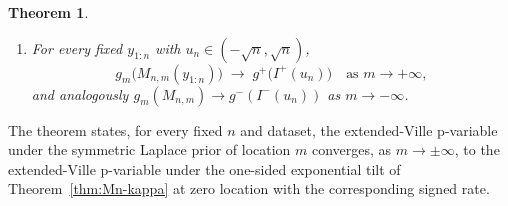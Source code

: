 \documentclass{article}%
\newtheorem{theorem}{Theorem}[section]
\newcommand{\E}{\mathbb{E}}
\newcommand{\1}{\mathbf{1}}
\begin{document}
\begin{theorem}
\begin{enumerate}
\begin{equation}
  g_m(c) \;:=\; \E_0\!\left[\min\!\Bigl(\tfrac{M_{2,m}(U_2)}{c},\,1\Bigr)\right],
  \quad
  g^\pm(c) \;:=\; \E_0\!\left[\min\!\Bigl(\tfrac{I^\pm(U_2)}{c},\,1\Bigr)\right],
  \quad c>0.
\end{equation}
    \item[(c)] For every fixed $y_{1:n}$ with
$u_n\in(-\sqrt n,\sqrt n)$,
\begin{equation}\label{eq:p-conv-Lap}
  g_m\!\bigl(M_{n,m}(y_{1:n})\bigr)
  \;\longrightarrow\; g^+\!\bigl(I^+(u_n)\bigr)
  \quad\text{as }m\to+\infty,
\end{equation}
and analogously $g_m(M_{n,m})\to g^-(I^-(u_n))$ as $m\to-\infty$.
\end{enumerate}
\end{theorem}
The theorem states, for every fixed $n$ and dataset, the extended-Ville p-variable under the symmetric Laplace prior of location $m$ converges, as
$m\to\pm\infty$, to the extended-Ville p-variable under the one-sided exponential tilt of Theorem~\ref{thm:Mn-kappa} at zero location with
the corresponding signed rate.
\end{document}
